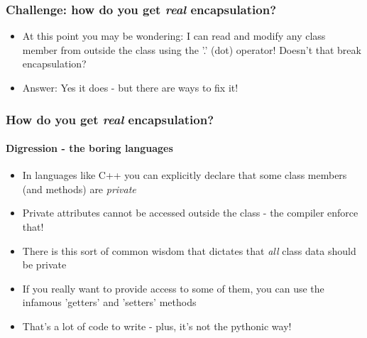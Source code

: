 \documentclass[9pt]{beamer}
\begin{document}
\begin{frame}
  \frametitle{Challenge: how do you get \emph{real} encapsulation?}
  \begin{itemize}
    \item At this point you may be wondering: I can read and modify any class member 
          from outside the class using the '.' (dot) operator! 
          Doesn't that break encapsulation?
          
    \bigskip
    
    \item Answer: Yes it does - but there are ways to fix it!
  \end{itemize}
\end{frame}


\begin{frame}
  \frametitle{How do you get \emph{real} encapsulation?}
  \framesubtitle{Digression - the boring languages}
  
  \begin{itemize}
    \item In languages like C++ you can explicitly declare that some class
          members (and methods) are \emph{private}
    \medskip
    \item Private attributes cannot be accessed outside the class - the compiler enforce that!
    \medskip
    \item There is this sort of common wisdom that dictates that \emph{all} class data should be private
    \medskip
    \item If you really want to provide access to some of them, you can use the infamous 'getters' and 'setters' methods
    \medskip
    \item That's a lot of code to write - plus, it's not the pythonic way!
  \end{itemize}
  
\end{frame}
\end{document}
